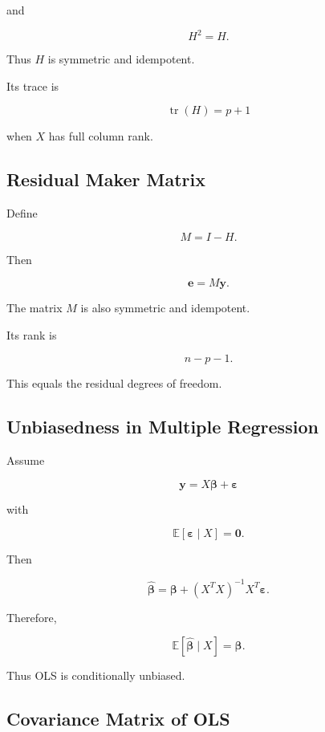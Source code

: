 and

\[
\boxed{
H^2=H.
}
\]

Thus \(H\) is symmetric and idempotent.

Its trace is

\[
\boxed{
\operatorname{tr}(H)
=
p+1
}
\]

when \(X\) has full column rank.

\subsection{Residual Maker Matrix}
\label{subsec:residual-maker}

Define

\[
\boxed{
M
=
I-H.
}
\]

Then

\[
\boxed{
\mathbf{e}
=
M\mathbf{y}.
}
\]

The matrix \(M\) is also symmetric and idempotent.

Its rank is

\[
\boxed{
n-p-1.
}
\]

This equals the residual degrees of freedom.

\subsection{Unbiasedness in Multiple Regression}
\label{subsec:unbiasedness-multiple-regression}

Assume

\[
\mathbf{y}
=
X\boldsymbol{\beta}
+
\boldsymbol{\varepsilon}
\]

with

\[
\mathbb{E}
[
\boldsymbol{\varepsilon}\mid X
]
=
\mathbf{0}.
\]

Then

\[
\widehat{\boldsymbol{\beta}}
=
\boldsymbol{\beta}
+
(X^TX)^{-1}
X^T
\boldsymbol{\varepsilon}.
\]

Therefore,

\[
\boxed{
\mathbb{E}
[
\widehat{\boldsymbol{\beta}}
\mid X
]
=
\boldsymbol{\beta}.
}
\]

Thus OLS is conditionally unbiased.

\subsection{Covariance Matrix of OLS}
\label{subsec:covariance-matrix-ols}

